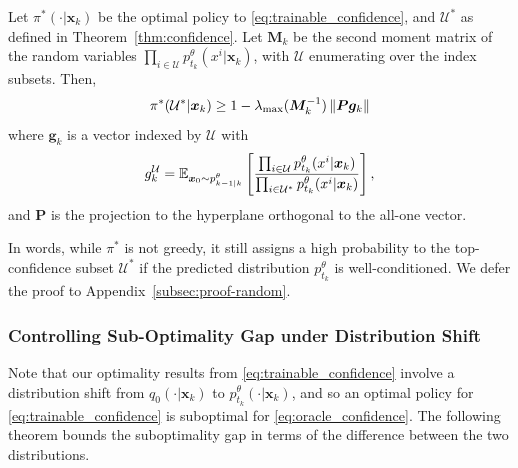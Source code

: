 \begin{theorem}\label{thm:confidence-rand}
    Let $\pi^*(\cdot|\bm x_k)$ be the optimal policy to \eqref{eq:trainable_confidence}, and $\mathcal U^*$ as defined in Theorem~\ref{thm:confidence}. Let $\bm M_k$ be the second moment matrix of the random variables $\prod_{i\in\mathcal U}p^\theta_{t_k}(x^i|\bm x_k)$, with $\mathcal U$ enumerating over the index subsets. Then,
    \begin{align*}
        \pi^*(\mathcal U^*|\bm x_k)\geq 1-\lambda_{\max}(\bm M_k^{-1})\left\|{\bm P\bm g_k}\right\|
    \end{align*}
    where $\bm g_k$ is a vector indexed by $\mathcal U$ with
    \begin{align*}
        g_k^{\mathcal U}=\mathbb{E}_{\bm x_0\sim p^\theta_{k-1|k}}\left[\frac{\prod_{i\in\mathcal U}p^\theta_{t_k}(x^i|\bm x_k)}{\prod_{i\in\mathcal U^*}p^\theta_{t_k}(x^i|\bm x_k)}\right],
    \end{align*}
    and $\bm P$ is the projection to the hyperplane orthogonal to the all-one vector.
\end{theorem}

In words, while $\pi^*$ is not greedy, it still assigns a high probability to the top-confidence subset $\mathcal U^*$ if the predicted distribution $p^\theta_{t_k}$ is well-conditioned. We defer the proof to Appendix~\ref{subsec:proof-random}.

\iffalse
\subsubsection{Controlling Sub-Optimality Gap under Distribution Shift}
 
Note that our optimality results from \eqref{eq:trainable_confidence} involve a distribution shift from $q_0(\cdot|\bm x_k)$ to $p^\theta_{t_k}(\cdot|\bm x_k)$, and so an optimal policy for \eqref{eq:trainable_confidence} is suboptimal for \eqref{eq:oracle_confidence}. The following theorem bounds the suboptimality gap in terms of the difference between the two distributions.

